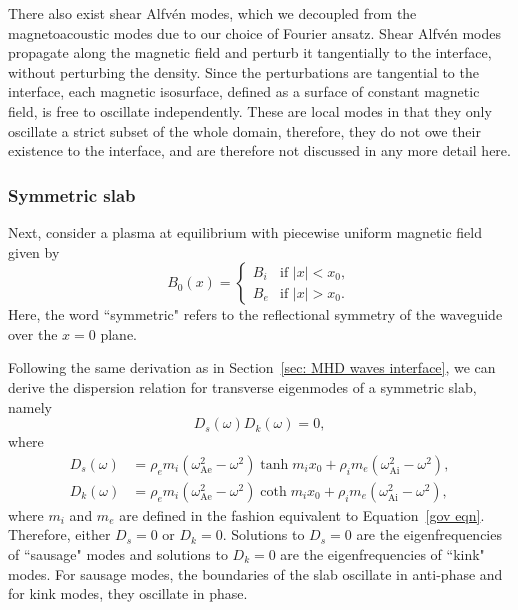 \documentclass[12pt]{../style-files/ociamthesis}
\begin{document}
There also exist shear Alfv\'{e}n modes, which we decoupled from the magnetoacoustic modes due to our choice of Fourier ansatz. Shear Alfv\'{e}n modes propagate along the magnetic field and perturb it tangentially to the interface, without perturbing the density. Since the perturbations are tangential to the interface, each magnetic isosurface, defined as a surface of constant magnetic field, is free to oscillate independently. These are local modes in that they only oscillate a strict subset of the whole domain, therefore, they do not owe their existence to the interface, and are therefore not discussed in any more detail here.


\subsubsection{Symmetric slab} \label{sec: MHD waves sym slab}

Next, consider a plasma at equilibrium  with piecewise uniform magnetic field given by
\begin{equation}
B_0(x) =
\begin{cases}
B_i & \text{if } |x| < x_0, \\
B_e & \text{if } |x| > x_0.
\end{cases}
\end{equation}
Here, the word ``symmetric" refers to the reflectional symmetry of the waveguide over the $x = 0$ plane.

Following the same derivation as in Section~\ref{sec: MHD waves interface}, we can derive the dispersion relation for transverse eigenmodes of a symmetric slab, namely
\begin{equation}
	D_s(\omega)D_k(\omega) = 0, \label{DR sym slab}
\end{equation}
where
\begin{align}
	D_s(\omega) &= \rho_em_i(\omega_\textrm{Ae}^2 - \omega^2)\tanh{m_ix_0} + \rho_im_e(\omega_\textrm{Ai}^2 - \omega^2), \\
	D_k(\omega) &= \rho_em_i(\omega_\textrm{Ae}^2 - \omega^2)\coth{m_ix_0} + \rho_im_e(\omega_\textrm{Ai}^2 - \omega^2),
\end{align}
where $m_i$ and $m_e$ are defined in the fashion equivalent to Equation~\eqref{gov eqn}. Therefore, either $D_s = 0$ or $D_k = 0$. Solutions to $D_s = 0$ are the eigenfrequencies of ``sausage" modes and solutions to $D_k = 0$ are the eigenfrequencies of ``kink" modes. For sausage modes, the boundaries of the slab oscillate in anti-phase and for kink modes, they oscillate in phase.
\end{document}
